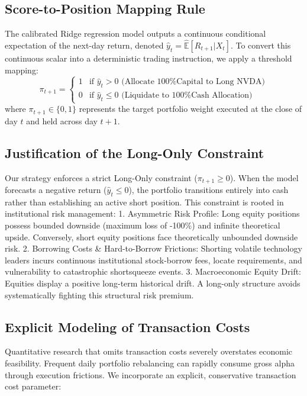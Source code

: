 \documentclass[12pt, a4paper]{article}
\begin{document}
\subsection{Score-to-Position Mapping Rule}
The calibrated Ridge regression model outputs a continuous conditional expectation of the next-day 
return, denoted $\hat{y}_t = \hat{\mathbb{E}}[R_{t+1} | X_t]$.
To convert this continuous scalar into a deterministic trading instruction, we apply a threshold mapping:
\begin{equation}
\pi_{t+1} = 
\begin{cases}
1 & \text{if } \hat{y}_t > 0 \text{ (Allocate 100\% Capital to Long NVDA)} \\
0 & \text{if } \hat{y}_t \le 0 \text{ (Liquidate to 100\% Cash Allocation)}
\end{cases}
\end{equation}
where $\pi_{t+1} \in \{0, 1\}$ represents the target portfolio weight executed at the close of day $t$ and held across 
day $t+1$.

\subsection{Justification of the Long-Only Constraint}
Our strategy enforces a strict Long-Only constraint ($\pi_{t+1} \ge 0$). When the model forecasts a negative 
return ($\hat{y}_t \le 0$), the portfolio transitions entirely into cash rather than establishing an active short position. 
This constraint is rooted in institutional risk management:
1. Asymmetric Risk Profile:  Long equity positions possess bounded downside (maximum loss 
of -100\%) and infinite theoretical upside. Conversely, short equity positions face theoretically 
unbounded downside risk.
2. Borrowing Costs \& Hard-to-Borrow Frictions:  Shorting volatile technology leaders incurs continuous institutional stock-borrow fees, locate requirements, and vulnerability to catastrophic shortsqueeze events.
3. Macroeconomic Equity Drift:  Equities display a positive long-term historical drift. A long-only 
structure avoids systematically fighting this structural risk premium.

\subsection{Explicit Modeling of Transaction Costs}

Quantitative research that omits transaction costs severely overstates economic feasibility. Frequent daily portfolio rebalancing can rapidly consume gross alpha through execution frictions. We incorporate an explicit, conservative transaction cost parameter:
\end{document}
